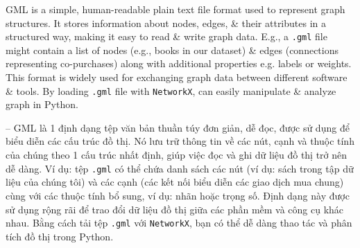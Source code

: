 \documentclass{article}
\begin{document}
\begin{itemize}
\begin{itemize}
\begin{itemize}
           GML is a simple, human-readable plain text file format used to represent graph structures. It stores information about nodes, edges, \& their attributes in a structured way, making it easy to read \& write graph data. E.g., a {\tt.gml} file might contain a list of nodes (e.g., books in our dataset) \& edges (connections representing co-purchases) along with additional properties e.g. labels or weights. This format is widely used for exchanging graph data between different software \& tools. By loading {\tt.gml} file with {\tt NetworkX}, can easily manipulate \& analyze graph in Python.

           -- GML là 1 định dạng tệp văn bản thuần túy đơn giản, dễ đọc, được sử dụng để biểu diễn các cấu trúc đồ thị. Nó lưu trữ thông tin về các nút, cạnh và thuộc tính của chúng theo 1 cấu trúc nhất định, giúp việc đọc và ghi dữ liệu đồ thị trở nên dễ dàng. Ví dụ: tệp {\tt.gml} có thể chứa danh sách các nút (ví dụ: sách trong tập dữ liệu của chúng tôi) và các cạnh (các kết nối biểu diễn các giao dịch mua chung) cùng với các thuộc tính bổ sung, ví dụ: nhãn hoặc trọng số. Định dạng này được sử dụng rộng rãi để trao đổi dữ liệu đồ thị giữa các phần mềm và công cụ khác nhau. Bằng cách tải tệp {\tt.gml} với {\tt NetworkX}, bạn có thể dễ dàng thao tác và phân tích đồ thị trong Python.


\end{itemize}
\end{itemize}
\end{itemize}
\end{document}
